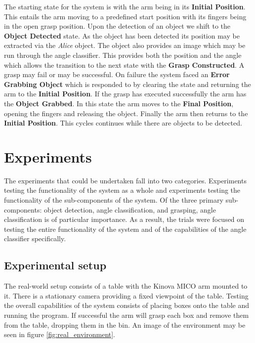 \documentclass[letterpaper, 10 pt, conference]{conf/ieeeconf}  %
\begin{document}
The starting state for the system is with the arm being in its \textbf{Initial
  Position}. This entails the arm moving to a predefined start position with its
fingers being in the open grasp position. Upon the detection of an object we
shift to the \textbf{Object Detected} state. As the object has been detected its
position may be extracted via the \textit{Alice} object. The object also
provides an image which may be run through the angle classifier. This provides
both the position and the angle which allows the transition to the next state
with the \textbf{Grasp Constructed}. A grasp may fail or may be successful. On
failure the system faced an \textbf{Error Grabbing Object} which is responded to
by clearing the state and returning the arm to the \textbf{Initial Position}. If
the grasp has executed successfully the arm has the \textbf{Object Grabbed}. In
this state the arm moves to the \textbf{Final Position}, opening the fingers and
releasing the object. Finally the arm then returns to the \textbf{Initial
  Position}. This cycles continues while there are objects to be detected.


\section{Experiments}
\label{sec:experiments}
The experiments that could be undertaken fall into two categories. Experiments
testing the functionality of the system as a whole and experiments testing the
functionality of the sub-components of the system. Of the three primary
sub-components: object detection, angle classification, and grasping, angle
classification is of particular importance. As a result, the trials were focused
on testing the entire functionality of the system and of the capabilities of the
angle classifier specifically.

\subsection{Experimental setup}
The real-world setup consists of a table with the Kinova MICO arm mounted to it.
There is a stationary camera providing a fixed viewpoint of the table. Testing
the overall capabilities of the system consists of placing boxes onto the table
and running the program. If successful the arm will grasp each box and remove
them from the table, dropping them in the bin. An image of the environment may
be seen in figure \ref{fig:real_environment}.
\end{document}
